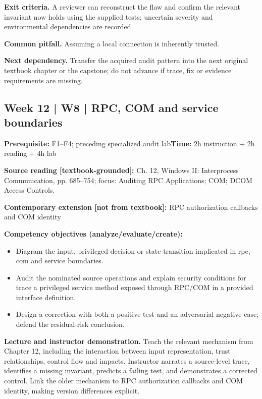 \documentclass[10pt,letterpaper]{article}
\begin{document}
\textbf{Exit criteria.} A reviewer can reconstruct the flaw and confirm the relevant invariant now holds using the supplied tests; uncertain severity and environmental dependencies are recorded.

\textbf{Common pitfall.} Assuming a local connection is inherently trusted.

\textbf{Next dependency.} Transfer the acquired audit pattern into the next original textbook chapter or the capstone; do not advance if trace, fix or evidence requirements are missing.

\subsection{Week 12 | W8 | RPC, COM and service boundaries}
\textbf{Prerequisite:} F1--F4; preceding specialized audit lab\hfill\textbf{Time:} 2h instruction + 2h reading + 4h lab

\textbf{Source reading [textbook-grounded]:} Ch. 12, Windows II: Interprocess Communication, pp. 685--754; focus: Auditing RPC Applications; COM; DCOM Access Controls.

\textbf{Contemporary extension [not from textbook]:} RPC authorization callbacks and COM identity

\textbf{Competency objectives (analyze/evaluate/create):}
\begin{itemize}[leftmargin=*,itemsep=2pt]
\item Diagram the input, privileged decision or state transition implicated in rpc, com and service boundaries.
\item Audit the nominated source operations and explain security conditions for trace a privileged service method exposed through RPC/COM in a provided interface definition.
\item Design a correction with both a positive test and an adversarial negative case; defend the residual-risk conclusion.
\end{itemize}
\textbf{Lecture and instructor demonstration.} Teach the relevant mechanism from Chapter 12, including the interaction between input representation, trust relationships, control flow and impacts. Instructor narrates a source-level trace, identifies a missing invariant, predicts a failing test, and demonstrates a corrected control. Link the older mechanism to RPC authorization callbacks and COM identity, making version differences explicit.
\end{document}
